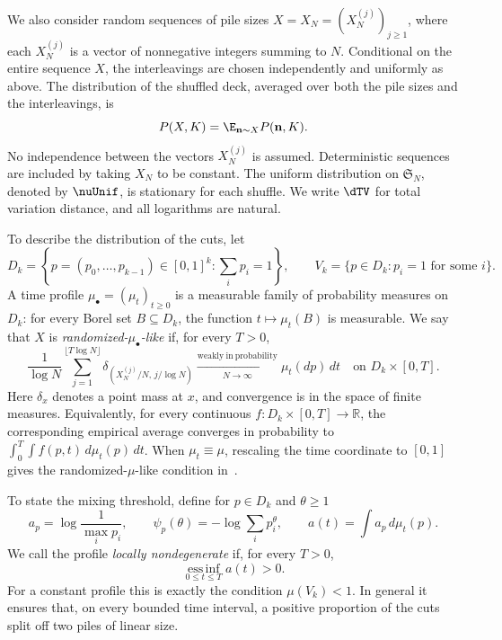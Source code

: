 We also consider random sequences of pile sizes
$X=X_N=(X_N^{(j)})_{j\ge1}$, where each $X_N^{(j)}$ is a vector of
nonnegative integers summing to $N$. Conditional on the entire sequence
$X$, the interleavings are chosen independently and uniformly as above.
The distribution of the shuffled deck, averaged over both the pile sizes
and the interleavings, is
\begin{equation}\label{eq:random-shuffle-law}
 P(X,K)=\E_{\mathbf n\sim X}P(\mathbf n,K).
\end{equation}
No independence between the vectors $X_N^{(j)}$ is assumed. Deterministic
sequences are included by taking $X_N$ to be constant. The uniform
distribution on $\mathfrak S_N$, denoted by $\nuUnif$, is stationary for
each shuffle. We write $\dTV$ for total variation distance, and all
logarithms are natural.

To describe the distribution of the cuts, let
\begin{equation}\label{eq:intro-simplex}
 D_k=\left\{p=(p_0,\ldots,p_{k-1})\in[0,1]^k:\sum_i p_i=1\right\},
 \qquad
 V_k=\{p\in D_k:p_i=1\text{ for some }i\}.
\end{equation}
A time profile $\mu_\bullet=(\mu_t)_{t\ge0}$ is a measurable family of
probability measures on $D_k$: for every Borel set $B\subseteq D_k$,
the function $t\mapsto\mu_t(B)$ is measurable. We say that $X$ is
\emph{randomized-$\mu_\bullet$-like} if, for every $T>0$,
\begin{equation}\label{eq:randomized-profile-like}
 \frac1{\log N}\sum_{j=1}^{\lfloor T\log N\rfloor}
       \delta_{(X_N^{(j)}/N,\,j/\log N)}
 \xrightarrow[N\to\infty]{\mathrm{weakly\ in\ probability}}
       \mu_t(dp)\,dt
 \quad\text{on }D_k\times[0,T].
\end{equation}
Here $\delta_x$ denotes a point mass at $x$, and convergence is in the
space of finite measures. Equivalently, for every continuous
$f:D_k\times[0,T]\to\mathbb R$, the corresponding empirical average
converges in probability to $\int_0^T\int f(p,t)\,d\mu_t(p)\,dt$.
When $\mu_t\equiv\mu$, rescaling the time coordinate to $[0,1]$ gives
the randomized-$\mu$-like condition in~\cite{SSW}.

To state the mixing threshold, define for $p\in D_k$ and $\theta\ge1$
\begin{equation}\label{eq:intro-costs}
 a_p=\log\frac1{\max_i p_i},\qquad
 \psi_p(\theta)=-\log\sum_i p_i^\theta,
 \qquad a(t)=\int a_p\,d\mu_t(p).
\end{equation}
We call the profile \emph{locally nondegenerate} if, for every $T>0$,
\begin{equation}\label{eq:profile-nondegeneracy}
 \operatorname*{ess\,inf}_{0\le t\le T}a(t)>0.
\end{equation}
For a constant profile this is exactly the condition $\mu(V_k)<1$.
In general it ensures that, on every bounded time interval, a positive
proportion of the cuts split off two piles of linear size.

